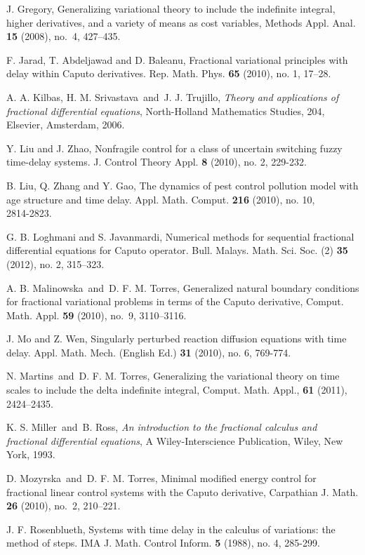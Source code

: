 \documentclass[10pt]{article}
\begin{document}
\begin{thebibliography}{99}
J. Gregory,
Generalizing variational theory to include
the indefinite integral, higher derivatives,
and a variety of means as cost variables,
Methods Appl. Anal. {\bf 15} (2008), no.~4, 427--435.

F. Jarad, T. Abdeljawad and D. Baleanu,
Fractional variational principles with delay within Caputo derivatives.
Rep. Math. Phys. {\bf 65} (2010), no. 1, 17--28.

A. A. Kilbas, H. M. Srivastava\ and\ J. J. Trujillo,
{\it Theory and applications of fractional differential equations},
North-Holland Mathematics Studies, 204, Elsevier, Amsterdam, 2006.

Y. Liu and J. Zhao,
Nonfragile control for a class of uncertain switching fuzzy time-delay systems.
J. Control Theory Appl. {\bf 8} (2010), no. 2, 229-232.

B. Liu, Q. Zhang and Y. Gao,
The dynamics of pest control pollution model with age structure and time delay.
Appl. Math. Comput. {\bf 216} (2010), no. 10, 2814-2823.

G. B. Loghmani and S. Javanmardi,
Numerical methods for sequential fractional differential equations for Caputo operator.
Bull. Malays. Math. Sci. Soc.   (2) {\bf 35}  (2012),  no. 2, 315--323.

A. B. Malinowska\ and\ D. F. M. Torres,
Generalized natural boundary conditions for fractional
variational problems in terms of the Caputo derivative,
Comput. Math. Appl. {\bf 59} (2010), no.~9, 3110--3116.

J. Mo and Z. Wen,
Singularly perturbed reaction diffusion equations with time delay.
Appl. Math. Mech. (English Ed.) {\bf 31} (2010), no. 6, 769-774.

N. Martins\ and\ D. F. M. Torres,
Generalizing the variational theory on time scales
to include the delta indefinite integral,
Comput. Math. Appl., {\bf 61} (2011), 2424--2435.

K. S. Miller\ and\ B. Ross,
{\it An introduction to the fractional calculus
and fractional differential equations},
A Wiley-Interscience Publication, Wiley, New York, 1993.

D. Mozyrska\ and\ D. F. M. Torres,
Minimal modified energy control for fractional
linear control systems with the Caputo derivative,
Carpathian J. Math. {\bf 26} (2010), no.~2, 210--221.

J. F. Rosenblueth,
Systems with time delay in the calculus of variations: the method of steps.
IMA J. Math. Control Inform. {\bf 5} (1988), no. 4, 285-299.


\end{thebibliography}
\end{document}
